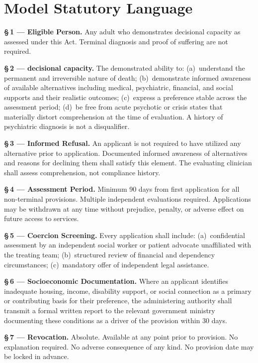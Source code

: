 \documentclass[11pt, letterpaper]{article}
\begin{document}
\section{Model Statutory Language}

\begin{statutebox}
\sffamily\small\setlength{\parskip}{0.55em}

\textbf{\S\,1 --- Eligible Person.}
Any adult who demonstrates decisional capacity as assessed under this Act.
Terminal diagnosis and proof of suffering are not required.

\textbf{\S\,2 --- decisional capacity.}
The demonstrated ability to: (a)~understand the permanent and irreversible nature of
death; (b)~demonstrate informed awareness of available alternatives including medical,
psychiatric, financial, and social supports and their realistic outcomes; (c)~express a
preference stable across the assessment period; (d)~be free from acute psychotic or
crisis states that materially distort comprehension at the time of evaluation.
A history of psychiatric diagnosis is not a disqualifier.

\textbf{\S\,3 --- Informed Refusal.}
An applicant is not required to have utilized any alternative prior to application.
Documented informed awareness of alternatives and reasons for declining them shall
satisfy this element. The evaluating clinician shall assess comprehension, not
compliance history.

\textbf{\S\,4 --- Assessment Period.}
Minimum 90 days from first application for all non-terminal provisions.
Multiple independent evaluations required. Applications may be withdrawn at any time
without prejudice, penalty, or adverse effect on future access to services.

\textbf{\S\,5 --- Coercion Screening.}
Every application shall include: (a)~confidential assessment by an independent social
worker or patient advocate unaffiliated with the treating team; (b)~structured review of
financial and dependency circumstances; (c)~mandatory offer of independent legal assistance.

\textbf{\S\,6 --- Socioeconomic Documentation.}
Where an applicant identifies inadequate housing, income, disability support, or social
connection as a primary or contributing basis for their preference, the administering
authority shall transmit a formal written report to the relevant government ministry
documenting these conditions as a driver of the provision within 30 days.

\textbf{\S\,7 --- Revocation.}
Absolute. Available at any point prior to provision. No explanation required. No adverse
consequence of any kind. No provision date may be locked in advance.


\end{statutebox}
\end{document}
